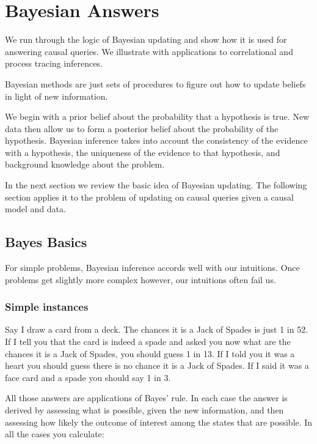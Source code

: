 \documentclass[
  12pt,
]{book}
\newenvironment{headerbox}{
  \definecolor{shadecolor}{rgb}{0.8, 0.8, 0.8}  %
  \color{black}
  \begin{shaded}}{\end{shaded}}
\begin{document}
\hypertarget{bayeschapter}{%
\chapter{Bayesian Answers}\label{bayeschapter}}

\begin{headerbox}
We run through the logic of Bayesian updating and show how it is used for answering causal queries. We illustrate with applications to correlational and process tracing inferences.

\end{headerbox}

Bayesian methods are just sets of procedures to figure out how to update beliefs in light of new information.

We begin with a prior belief about the probability that a hypothesis is true. New data then allow us to form a posterior belief about the probability of the hypothesis. Bayesian inference takes into account the consistency of the evidence with a hypothesis, the uniqueness of the evidence to that hypothesis, and background knowledge about the problem.

In the next section we review the basic idea of Bayesian updating. The following section applies it to the problem of updating on causal queries given a causal model and data.

\hypertarget{bayes-basics}{%
\section{Bayes Basics}\label{bayes-basics}}

For simple problems, Bayesian inference accords well with our intuitions. Once problems get slightly more complex however, our intuitions often fail us.

\hypertarget{simple-instances}{%
\subsection{Simple instances}\label{simple-instances}}

Say I draw a card from a deck. The chances it is a Jack of Spades is just 1 in 52. If I tell you that the card is indeed a spade and asked you now what are the chances it is a Jack of Spades, you should guess 1 in 13. If I told you it was a heart you should guess there is no chance it is a Jack of Spades. If I said it was a face card and a spade you should say 1 in 3.

All those answers are applications of Bayes' rule. In each case the answer is derived by assessing what is possible, given the new information, and then assessing how likely the outcome of interest among the states that are possible. In all the cases you calculate:
\end{document}
